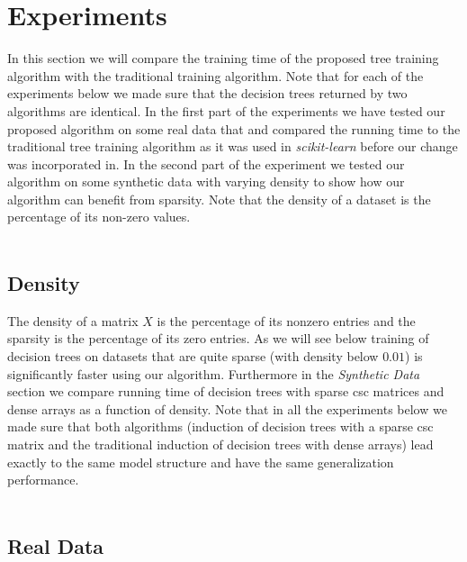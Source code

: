 \section{Experiments} \label{sec:experiments}

In this section we will compare the training time of the proposed tree training algorithm with the traditional training algorithm. Note that for each of the experiments below we made sure that the decision trees returned by two algorithms are identical. In the first part of the experiments we have tested our proposed algorithm on some real data that and compared the running time to the traditional tree training algorithm as it was used in \emph{scikit-learn} before our change was incorporated in. In the second part of the experiment we tested our algorithm on some synthetic data with varying density to show how our algorithm can benefit from sparsity. Note that the density of a dataset is the percentage of its non-zero values. \\\\

\subsection{Density}
The density of a matrix $X$ is the percentage of its nonzero entries and the sparsity is the percentage of its zero entries. As we will see below training of decision trees on datasets that are quite sparse (with density below $0.01$) is significantly faster using our algorithm. Furthermore in the \emph{Synthetic Data} section we compare running time of decision trees with sparse csc matrices and dense arrays as a function of density. Note that in all the experiments below we made sure that both algorithms (induction of decision trees with a sparse csc matrix and the traditional induction of decision trees with dense arrays) lead exactly to the same model structure and have the same generalization performance.\\\\

\subsection{Real Data}

